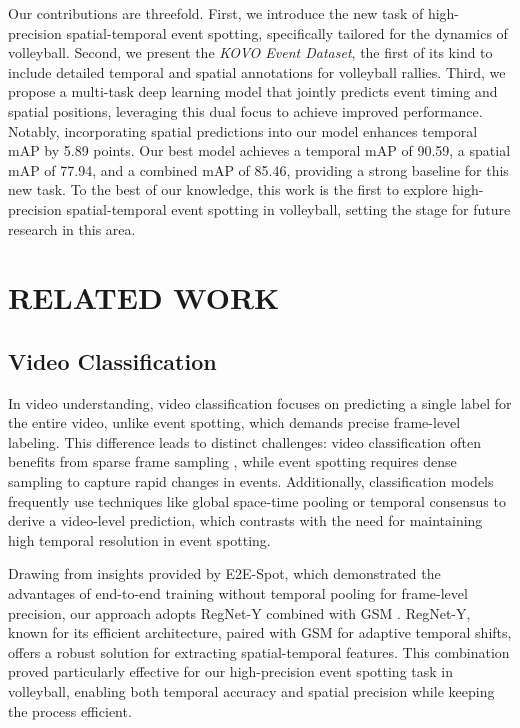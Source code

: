 \documentclass[a4paper,twoside]{article}
\begin{document}
Our contributions are threefold. First, we introduce the new task of high-precision spatial-temporal event spotting, specifically tailored for the dynamics of volleyball. Second, we present the \textit{KOVO Event Dataset}, the first of its kind to include detailed temporal and spatial annotations for volleyball rallies. Third, we propose a multi-task deep learning model that jointly predicts event timing and spatial positions, leveraging this dual focus to achieve improved performance. Notably, incorporating spatial predictions into our model enhances temporal mAP by 5.89 points. Our best model achieves a temporal mAP of 90.59, a spatial mAP of 77.94, and a combined mAP of 85.46, providing a strong baseline for this new task. To the best of our knowledge, this work is the first to explore high-precision spatial-temporal event spotting in volleyball, setting the stage for future research in this area.




\section{\uppercase{Related work}}

\subsection{Video Classification}
In video understanding, video classification focuses on predicting a single label for the entire video, unlike event spotting, which demands precise frame-level labeling. This difference leads to distinct challenges: video classification often benefits from sparse frame sampling \cite{tsn}, while event spotting requires dense sampling to capture rapid changes in events. Additionally, classification models frequently use techniques like global space-time pooling \cite{8578773} or temporal consensus \cite{zhou2018temporalrelationalreasoningvideos} to derive a video-level prediction, which contrasts with the need for maintaining high temporal resolution in event spotting.

Drawing from insights provided by E2E-Spot, which demonstrated the advantages of end-to-end training without temporal pooling for frame-level precision, our approach adopts RegNet-Y \cite{radosavovic2020designingnetworkdesignspaces} combined with GSM \cite{9156729}. RegNet-Y, known for its efficient architecture, paired with GSM for adaptive temporal shifts, offers a robust solution for extracting spatial-temporal features. This combination proved particularly effective for our high-precision event spotting task in volleyball, enabling both temporal accuracy and spatial precision while keeping the process efficient.
\end{document}
